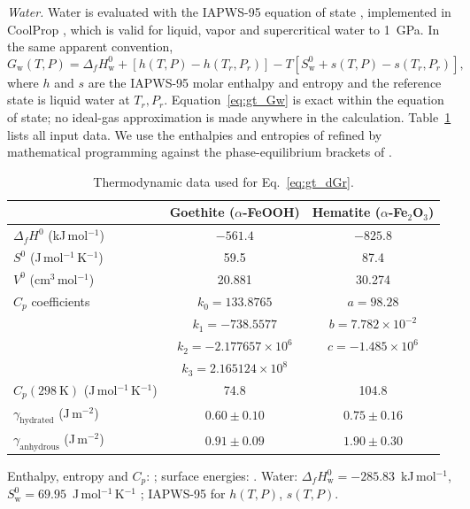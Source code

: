 \textit{Water.} Water is evaluated with the IAPWS-95 equation of state \citep{wagner2002},
implemented in CoolProp \citep{bell2014}, which is valid for liquid, vapor and supercritical
water to 1~GPa. In the same apparent convention,
\begin{equation}
  G_{\mathrm{w}}(T,P) = \Delta_f H_{\mathrm{w}}^{0} + \left[h(T,P) - h(T_r,P_r)\right]
  - T\left[S_{\mathrm{w}}^{0} + s(T,P) - s(T_r,P_r)\right],
  \label{eq:gt_Gw}
\end{equation}
where $h$ and $s$ are the IAPWS-95 molar enthalpy and entropy and the reference state is liquid
water at $T_r,P_r$. Equation~\eqref{eq:gt_Gw} is exact within the equation of state; no ideal-gas
approximation is made anywhere in the calculation. Table~\ref{tab:gt_thermo_data} lists all
input data. We use the enthalpies and entropies of \citet{majzlan2003} refined by mathematical
programming against the phase-equilibrium brackets of \citet{voigt1981}.

\begin{table}[htbp]
  \centering
  \caption{Thermodynamic data used for Eq.~\eqref{eq:gt_dGr}.}
  \label{tab:gt_thermo_data}
  \begin{footnotesize}
  \begin{tabular}{lcc}
    \hline
    & Goethite ($\alpha$-FeOOH) & Hematite ($\alpha$-Fe$_2$O$_3$) \\
    \hline
    $\Delta_f H^0$ (kJ\,mol$^{-1}$) & $-561.4$ & $-825.8$ \\
    $S^0$ (J\,mol$^{-1}$\,K$^{-1}$) & 59.5 & 87.4 \\
    $V^0$ (cm$^3$\,mol$^{-1}$) & 20.881 & 30.274 \\
    $C_p$ coefficients & $k_0=133.8765$ & $a=98.28$ \\
          & $k_1=-738.5577$ & $b=7.782\times10^{-2}$ \\
          & $k_2=-2.177657\times10^{6}$ & $c=-1.485\times10^{6}$ \\
          & $k_3=2.165124\times10^{8}$ & \\
    $C_p(298\ \mathrm{K})$ (J\,mol$^{-1}$\,K$^{-1}$) & 74.8 & 104.8 \\
    $\gamma_{\mathrm{hydrated}}$ (J\,m$^{-2}$) & $0.60\pm0.10$ & $0.75\pm0.16$ \\
    $\gamma_{\mathrm{anhydrous}}$ (J\,m$^{-2}$) & $0.91\pm0.09$ & $1.90\pm0.30$ \\
    \hline
  \end{tabular}
  \end{footnotesize}

  \vspace{0.5ex}
  \begin{minipage}{0.85\linewidth}\footnotesize
  Enthalpy, entropy and $C_p$: \citet{majzlan2003a,majzlan2003}; surface energies: \citet{navrotsky2008}.
  Water: $\Delta_f H^0_{\mathrm{w}} = -285.83$~kJ\,mol$^{-1}$, $S^0_{\mathrm{w}} = 69.95$~J\,mol$^{-1}$\,K$^{-1}$ \citep{cox1989}; IAPWS-95 for $h(T,P)$, $s(T,P)$.
  \end{minipage}
\end{table}


